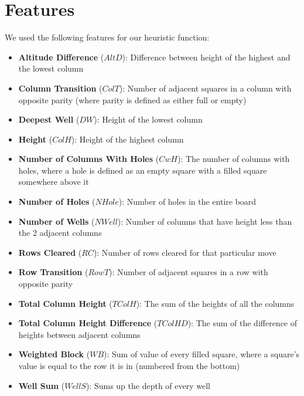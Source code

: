 \documentclass[12pt]{article}
\begin{document}
    \section{Features}
	\vspace{-0.3cm}
    We used the following features for our heuristic function:
    \begin{itemize}
		\setlength\itemsep{-1mm}
        \item \textbf{Altitude Difference} ($AltD$): Difference between height of the highest
        and the lowest column
		\item \textbf{Column Transition} ($ColT$): Number of adjacent squares in a column with opposite parity (where parity is defined as either full or empty)
		\item \textbf{Deepest Well} ($DW$): Height of the lowest column
        \item \textbf{Height} ($ColH$): Height of the highest column
		\item \textbf{Number of Columns With Holes} ($CwH$): The number of columns with holes, where a hole
		is defined as an empty square with a filled square somewhere above it
        \item \textbf{Number of Holes} ($NHole$): Number of holes in the entire board
        \item \textbf{Number of Wells} ($NWell$): Number of columns that have height less than the 2
        adjacent columns
		\item \textbf{Rows Cleared} ($RC$): Number of rows cleared for that particular move
		\item \textbf{Row Transition} ($RowT$): Number of adjacent squares in a row with opposite parity
        \item \textbf{Total Column Height} ($TColH$): The sum of the heights of all the columns
        \item \textbf{Total Column Height Difference} ($TColHD$): The sum of the difference of heights between adjacent columns
        \item \textbf{Weighted Block} ($WB$): Sum of value of every filled square, where a square's value is equal to
		the row it is in (numbered from the bottom)
        \item \textbf{Well Sum} ($WellS$): Sums up the depth of every well
    \end{itemize}

\end{document}
